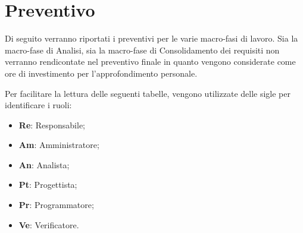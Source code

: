 \documentclass[../piano-di-progetto.tex]{subfiles}
\begin{document}
  \section{Preventivo}
  Di seguito verranno riportati i preventivi per le varie macro-fasi di lavoro. Sia la macro-fase di Analisi, sia la macro-fase di Consolidamento dei requisiti non verranno rendicontate nel preventivo finale in quanto vengono considerate come ore di investimento per l’approfondimento personale.

  Per facilitare la lettura delle seguenti tabelle, vengono utilizzate delle sigle per identificare i ruoli:
  \begin{itemize}
    \item \textbf{Re}: Responsabile;
    \item \textbf{Am}: Amministratore;
    \item \textbf{An}: Analista;
    \item \textbf{Pt}: Progettista;
    \item \textbf{Pr}: Programmatore;
    \item \textbf{Ve}: Verificatore.
  \end{itemize}

  
  
  
  
  
\end{document}
